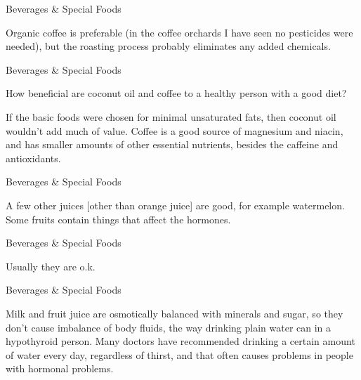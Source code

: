 \documentclass[11pt,oneside,openany,extrafontsizes]{memoir}
\begin{document}
\begin{standalonequote}{Beverages \& Special Foods}

    \begin{answer}
        Organic coffee is preferable (in the coffee orchards I have seen no pesticides were needed), but the roasting process probably eliminates any added chemicals.
    \end{answer}
\end{standalonequote}

\begin{qaexchange}{Beverages \& Special Foods}

    \begin{question}
        How beneficial are coconut oil and coffee to a healthy person with a good diet?
    \end{question}

    \begin{answer}
        If the basic foods were chosen for minimal unsaturated fats, then coconut oil wouldn't add much of value. Coffee is a good source of magnesium and niacin, and has smaller amounts of other essential nutrients, besides the caffeine and antioxidants.
    \end{answer}
\end{qaexchange}

\begin{standalonequote}{Beverages \& Special Foods}

    \begin{answer}
        A few other juices [other than orange juice] are good, for example watermelon. Some fruits contain things that affect the hormones.
    \end{answer}
\end{standalonequote}

\begin{standalonequote}{Beverages \& Special Foods}

    \begin{answer}
        Usually they are o.k.
    \end{answer}
\end{standalonequote}

\begin{standalonequote}{Beverages \& Special Foods}

    \begin{answer}
        Milk and fruit juice are osmotically balanced with minerals and sugar, so they don't cause imbalance of body fluids, the way drinking plain water can in a hypothyroid person. Many doctors have recommended drinking a certain amount of water every day, regardless of thirst, and that often causes problems in people with hormonal problems.
    \end{answer}
\end{standalonequote}
\end{document}
